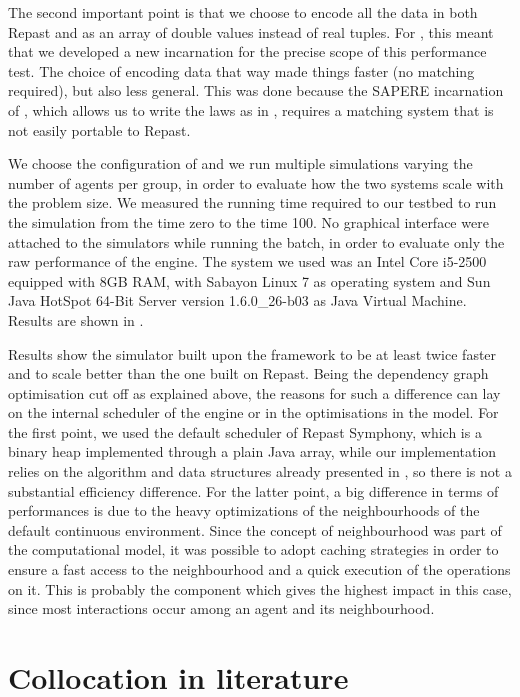 \documentclass[12pt,a4paper,twoside,openright]{book}
\begin{document}
The second important point is that we choose to encode all the data in both Repast and \alchemist{} as an array of double values instead of real tuples.
%
For \alchemist{}, this meant that we developed a new incarnation for the precise scope of this performance test.
%
The choice of encoding data that way made things faster (no matching required), but also less general.
%
This was done because the SAPERE incarnation of \alchemist{}, which allows us to write the laws as in , requires a matching system that is not easily portable to Repast.

We choose the configuration of  and we run multiple simulations varying the number of agents per group, in order to evaluate how the two systems scale with the problem size.
%
We measured the running time required to our testbed to run the simulation from the time zero to the time 100.
%
No graphical interface were attached to the simulators while running the batch, in order to evaluate only the raw performance of the engine.
%
The system we used was an Intel Core i5-2500 equipped with 8GB RAM, with Sabayon Linux 7 as operating system and Sun Java HotSpot\texttrademark{} 64-Bit Server version 1.6.0\_26-b03 as Java Virtual Machine.
%
Results are shown in .

Results show the simulator built upon the \alchemist{} framework to be at least twice faster and to scale better than the one built on Repast.
%
Being the dependency graph optimisation cut off as explained above, the reasons for such a difference can lay on the internal scheduler of the engine or in the optimisations in the model.
%
For the first point, we used the default scheduler of Repast Symphony, which is a binary heap implemented through a plain Java array, while our implementation relies on the algorithm and data structures already presented in , so there is not a substantial efficiency difference.
%
For the latter point, a big difference in terms of performances is due to the heavy optimizations of the neighbourhoods of the default \alchemist{} continuous environment.
%
Since the concept of neighbourhood was part of the computational model, it was possible to adopt caching strategies in order to ensure a fast access to the neighbourhood and a quick execution of the operations on it.
%
This is probably the component which gives the highest impact in this case, since most interactions occur among an agent and its neighbourhood.

\section{Collocation in literature}
\end{document}
